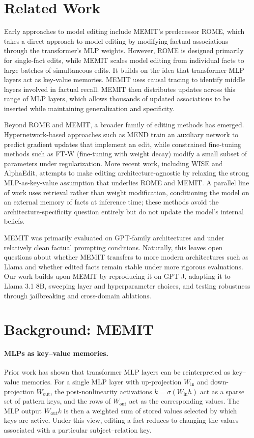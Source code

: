 \documentclass[11pt]{article}
\begin{document}
\section{Related Work}
Early approaches to model editing include MEMIT's predecessor ROME, which takes a direct approach to model editing by modifying factual associations through the transformer's MLP weights. However, ROME is designed primarily for single-fact edits, while MEMIT scales model editing from individual facts to large batches of simultaneous edits. It builds on the idea that transformer MLP layers act as key-value memories. MEMIT uses causal tracing to identify middle layers involved in factual recall. MEMIT then distributes updates across this range of MLP layers, which allows thousands of updated associations to be inserted while maintaining generalization and specificity.

Beyond ROME and MEMIT, a broader family of editing methods has emerged. Hypernetwork-based approaches such as MEND train an auxiliary network to predict gradient updates that implement an edit, while constrained fine-tuning methods such as FT-W (fine-tuning with weight decay) modify a small subset of parameters under regularization. More recent work, including WISE and AlphaEdit, attempts to make editing architecture-agnostic by relaxing the strong MLP-as-key-value assumption that underlies ROME and MEMIT. A parallel line of work uses retrieval rather than weight modification, conditioning the model on an external memory of facts at inference time; these methods avoid the architecture-specificity question entirely but do not update the model's internal beliefs.

MEMIT was primarily evaluated on GPT-family architectures and under relatively clean factual prompting conditions. Naturally, this leaves open questions about whether MEMIT transfers to more modern architectures such as Llama and whether edited facts remain stable under more rigorous evaluations. Our work builds upon MEMIT by reproducing it on GPT-J, adapting it to Llama 3.1 8B, sweeping layer and hyperparameter choices, and testing robustness through jailbreaking and cross-domain ablations.

\section{Background: MEMIT}
\label{sec:background}

\paragraph{MLPs as key--value memories.}
Prior work has shown that transformer MLP layers can be reinterpreted as key--value memories. For a single MLP layer with up-projection $W_{\text{in}}$ and down-projection $W_{\text{out}}$, the post-nonlinearity activations $k = \sigma(W_{\text{in}} h)$ act as a sparse set of pattern keys, and the rows of $W_{\text{out}}$ act as the corresponding values. The MLP output $W_{\text{out}} k$ is then a weighted sum of stored values selected by which keys are active. Under this view, editing a fact reduces to changing the values associated with a particular subject--relation key.
\end{document}
